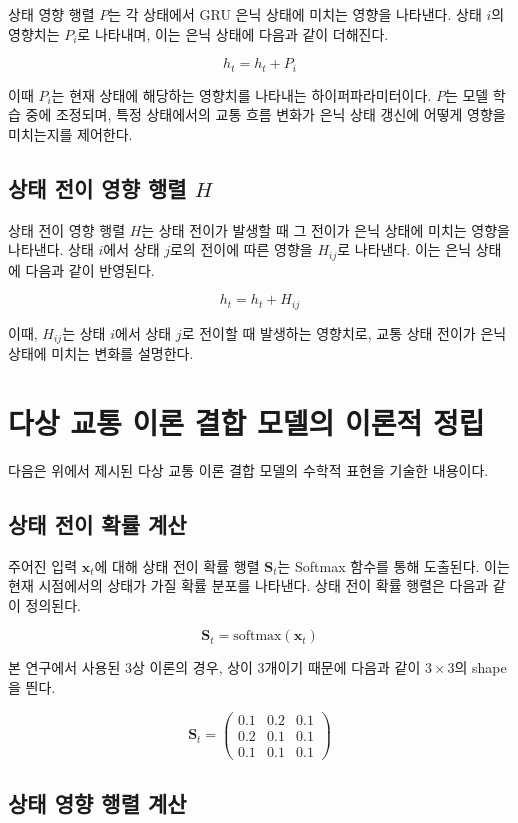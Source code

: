 \documentclass[11pt]{report}
\begin{document}
상태 영향 행렬 \( P \)는 각 상태에서 GRU 은닉 상태에 미치는 영향을 나타낸다. 
상태 \( i \)의 영향치는 \( P_i \)로 나타내며, 이는 은닉 상태에 다음과 같이 더해진다. 

\[
h_t = h_t + P_i
\]

이때 \( P_i \)는 현재 상태에 해당하는 영향치를 나타내는 하이퍼파라미터이다. 
\( P \)는 모델 학습 중에 조정되며, 특정 상태에서의 교통 흐름 변화가 은닉 상태 갱신에 어떻게 영향을 미치는지를 제어한다.

\subsection{상태 전이 영향 행렬 \( H \)}

상태 전이 영향 행렬 \( H \)는 상태 전이가 발생할 때 그 전이가 은닉 상태에 미치는 영향을 나타낸다. 
상태 \( i \)에서 상태 \( j \)로의 전이에 따른 영향을 \( H_{ij} \)로 나타낸다. 이는 은닉 상태에 다음과 같이 반영된다. 

\[
h_t = h_t + H_{ij}
\]

이때, \( H_{ij} \)는 상태 \( i \)에서 상태 \( j \)로 전이할 때 발생하는 영향치로, 교통 상태 전이가 은닉 상태에 미치는 변화를 설명한다.

\section{다상 교통 이론 결합 모델의 이론적 정립}
다음은 위에서 제시된 다상 교통 이론 결합 모델의 수학적 표현을 기술한 내용이다.

\subsection{상태 전이 확률 계산}

주어진 입력 \( \mathbf{x}_t \)에 대해 상태 전이 확률 행렬 \( \mathbf{S}_t \)는 Softmax 함수를 통해 도출된다. 이는 현재 시점에서의 상태가 가질 확률 분포를 나타낸다. 상태 전이 확률 행렬은 다음과 같이 정의된다.

$$
\mathbf{S}_t = \text{softmax}(\mathbf{x}_t)
$$

본 연구에서 사용된 3상 이론의 경우, 상이 3개이기 때문에 다음과 같이 $3 \times 3$의 shape을 띈다. 

$$
\mathbf{S}_t = 
\begin{pmatrix}
	0.1 & 0.2 & 0.1\\
	0.2 & 0.1 & 0.1\\
	0.1 & 0.1 & 0.1
\end{pmatrix}
$$

\subsection{상태 영향 행렬 계산}
\end{document}
